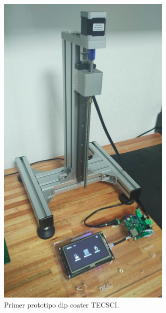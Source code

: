 \begin{figure}[h]
	\centering
	\includegraphics[width=0.75\textwidth]{./Figures/real.png}
	\caption{Primer prototipo dip coater TECSCI.}
	\label{fig:mecanica_real_model}
\end{figure}

